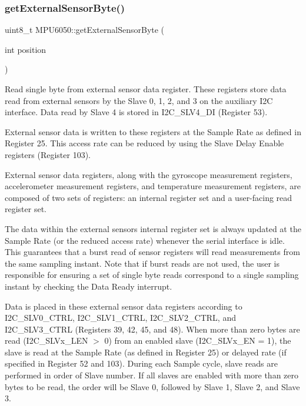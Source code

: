 \subsubsection{\texorpdfstring{getExternalSensorByte()}{getExternalSensorByte()}}
{\footnotesize\ttfamily uint8\+\_\+t M\+P\+U6050\+::get\+External\+Sensor\+Byte (\begin{DoxyParamCaption}\item[{int}]{position }\end{DoxyParamCaption})}

Read single byte from external sensor data register. These registers store data read from external sensors by the Slave 0, 1, 2, and 3 on the auxiliary I2C interface. Data read by Slave 4 is stored in I2\+C\+\_\+\+S\+L\+V4\+\_\+\+DI (Register 53).

External sensor data is written to these registers at the Sample Rate as defined in Register 25. This access rate can be reduced by using the Slave Delay Enable registers (Register 103).

External sensor data registers, along with the gyroscope measurement registers, accelerometer measurement registers, and temperature measurement registers, are composed of two sets of registers\+: an internal register set and a user-\/facing read register set.

The data within the external sensors\textquotesingle{} internal register set is always updated at the Sample Rate (or the reduced access rate) whenever the serial interface is idle. This guarantees that a burst read of sensor registers will read measurements from the same sampling instant. Note that if burst reads are not used, the user is responsible for ensuring a set of single byte reads correspond to a single sampling instant by checking the Data Ready interrupt.

Data is placed in these external sensor data registers according to I2\+C\+\_\+\+S\+L\+V0\+\_\+\+C\+T\+RL, I2\+C\+\_\+\+S\+L\+V1\+\_\+\+C\+T\+RL, I2\+C\+\_\+\+S\+L\+V2\+\_\+\+C\+T\+RL, and I2\+C\+\_\+\+S\+L\+V3\+\_\+\+C\+T\+RL (Registers 39, 42, 45, and 48). When more than zero bytes are read (I2\+C\+\_\+\+S\+L\+Vx\+\_\+\+L\+EN $>$ 0) from an enabled slave (I2\+C\+\_\+\+S\+L\+Vx\+\_\+\+EN = 1), the slave is read at the Sample Rate (as defined in Register 25) or delayed rate (if specified in Register 52 and 103). During each Sample cycle, slave reads are performed in order of Slave number. If all slaves are enabled with more than zero bytes to be read, the order will be Slave 0, followed by Slave 1, Slave 2, and Slave 3.

